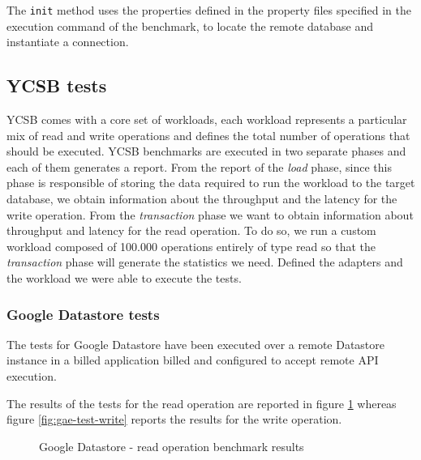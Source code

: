 \noindent The \texttt{init} method uses the properties defined in the property files specified in the execution command of the benchmark, to locate the remote database and instantiate a connection.

\subsection{YCSB tests}
YCSB comes with a core set of workloads, each workload represents a particular mix of read and write operations and defines the total number of operations that should be executed. 
\noindent YCSB benchmarks are executed in two separate phases and each of them generates a report. From the report of the \textit{load} phase, since this phase is responsible of storing the data required to run the workload to the target database, we obtain information about the throughput and the latency for the write operation. From the \textit{transaction} phase we want to obtain information about throughput and latency for the read operation. To do so, we run a custom workload composed of 100.000 operations entirely of type read so that the \textit{transaction} phase will generate the statistics we need.
\noindent Defined the adapters and the workload we were able to execute the tests.

\subsubsection{Google Datastore tests}
The tests for Google Datastore have been executed over a remote Datastore instance in a billed application billed and configured to accept remote API execution.

\noindent The results of the tests for the read operation are reported in figure \ref{fig:gae-test-read} whereas figure \ref{fig:gae-test-write} reports the results for the write operation.
 
\begin{figure}[tbh]
  \centering
  \caption{Google Datastore - read operation benchmark results}
  \label{fig:gae-test-read}
\end{figure} 

